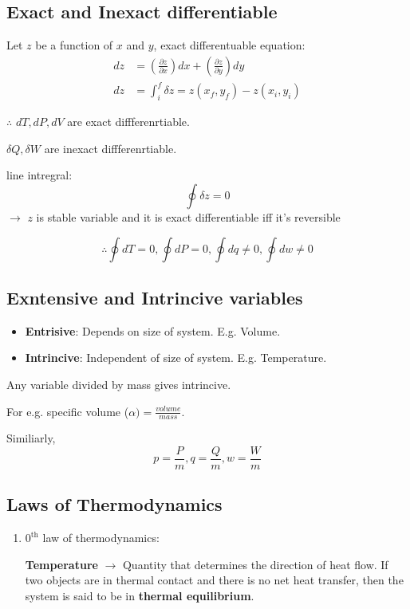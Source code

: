 \documentclass[fleqn,10pt]{SelfArx} %
\begin{document}
\subsection{Exact and Inexact differentiable}
Let $z$ be a function of $x$ and $y$, exact differentuable equation:
\begin{align}
    dz &= \left(\frac{\partial z}{\partial x}\right) dx + \left(\frac{\partial z}{\partial y}\right) dy \\
    dz &= \int_i^f \delta z = z(x_f,y_f) - z(x_i,y_i)
\end{align}

$\therefore$ $dT,dP,dV$ are exact diffferenrtiable.

$\delta Q, \delta W$ are inexact diffferenrtiable.

line intregral:
$$
\oint \delta z = 0
$$
$\rightarrow$ $z$ is stable variable and it is exact differentiable iff it's reversible

$$
\therefore \oint dT = 0, \oint dP = 0, \oint dq \neq 0, \oint dw \neq 0 
$$

\subsection{Exntensive and Intrincive variables}
\begin{itemize}[noitemsep]
    \item \textbf{Entrisive}: Depends on size of system. E.g. Volume.
    \item \textbf{Intrincive}: Independent of size of system. E.g. Temperature.
\end{itemize}

Any variable divided by mass gives intrincive.

For e.g. specific volume ($\alpha) = \frac{volume}{mass}$.

Similiarly, $$p = \frac{P}{m}, q = \frac{Q}{m}, w = \frac{W}{m}$$

\subsection{Laws of Thermodynamics}
\begin{enumerate}
    \item $0^\text{th}$ law of thermodynamics:

    \textbf{Temperature} $\rightarrow$ Quantity that determines the direction of heat flow. If two objects are in thermal contact and there is no net heat transfer, then the system is said to be in \textbf{thermal equilibrium}.
\end{enumerate}
\end{document}
